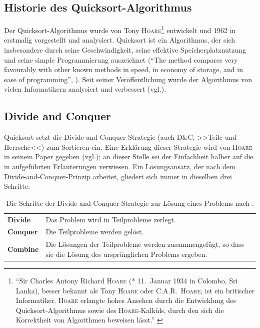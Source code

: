 \documentclass[11pt, a4paper, oneside, openright]{article}
\newcommand \vgl{vgl.\xspace }
\newcommand \Seite{S.\,}
\begin{document}
\subsection{Historie des Quicksort-Algorithmus}
Der Quicksort-Algorithmus wurde von Tony \textsc{Hoare}\footnote{\enquote{Sir Charles Antony Richard \textsc{Hoare} (* 11.~Januar 1934 in Colombo, Sri Lanka), besser bekannt als Tony \textsc{Hoare} oder C.A.R.~\textsc{Hoare}, ist ein britischer Informatiker. \textsc{Hoare} erlangte hohes Ansehen durch die Entwicklung des Quicksort-Algorithmus sowie des \textsc{Hoare}-Kalküls, durch den sich die Korrektheit von Algorithmen beweisen lässt.} \cite{wikiHoare}} entwickelt und 1962 in \cite{hoare} erstmalig vorgestellt und analysiert. Quicksort ist ein Algorithmus, der sich insbesondere durch seine Geschwindigkeit, seine effektive Speicherplatznutzung und seine simple Programmierung auszeichnet (\enquote{The method compares very favourably with other known methods in speed, in economy of storage, and in ease of programming}, \cite[\Seite 1]{hoare}). Seit seiner Veröffentlichung wurde der Algorithmus von vielen Informatikern analysiert und verbessert (\vgl\cite{wikiQS}).





\subsection{Divide and Conquer}
Quicksort setzt die Divide-and-Conquer-Strategie (auch D\&C, >>Teile und Herrsche<<) zum Sortieren ein. Eine Erklärung dieser Strategie wird von \textsc{Hoare} in seinem Paper gegeben (\vgl \cite[\Seite 1]{hoare}); an dieser Stelle sei der Einfachheit halber auf die in \cite{uniflensburgDuC} aufgeführten Erläuterungen verwiesen. Ein Lösungsansatz, der nach dem Divide-and-Conquer-Prinzip arbeitet, gliedert sich immer in dieselben drei Schritte:

\begin{table}[H]
    \begin{center}
        \begin{tabular}{p{2cm}p{10cm}}
            \textbf{Divide}  & Das Problem wird in Teilprobleme zerlegt. \\
            \textbf{Conquer} & Die Teilprobleme werden gelöst. \\
            \textbf{Combine} & Die Lösungen der Teilprobleme werden zusammengefügt, so dass sie die Lösung des ursprünglichen Problems ergeben.
        \end{tabular} 
        \caption[Schritte der Divide-and-Conquer-Strategie.]{Die Schritte der Divide-and-Conquer-Strategie zur Lösung eines Problems nach \cite{uniflensburgDuC}.}
        \label{tabl:dundc}
    \end{center}
\end{table}
\end{document}
